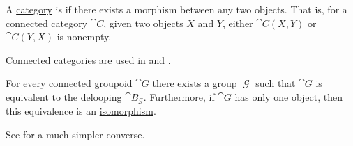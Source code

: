 \begin{definition}\label{def:connected_category}
  A \hyperref[def:category]{category} is  if there exists a morphism between any two objects. That is, for a connected category \( \cat{C} \), given two objects \( X \) and \( Y \), either \( \cat{C}(X, Y) \) or \( \cat{C}(Y, X) \) is nonempty.

  Connected categories are used in  and .
\end{definition}

\begin{proposition}\label{thm:connected_delooping}
  For every \hyperref[def:connected_category]{connected} \hyperref[def:groupoid]{groupoid} \( \cat{G} \) there exists a \hyperref[def:group]{group} \( \mscrG \) such that \( \cat{G} \) is \hyperref[def:category_equivalence]{equivalent} to the \hyperref[def:monoid_delooping]{delooping} \( \cat{B}_\mscrG \). Furthermore, if \( \cat{G} \) has only one object, then this equivalence is an \hyperref[rem:category_similarity/isomorphism]{isomorphism}.

  See  for a much simpler converse.
\end{proposition}
